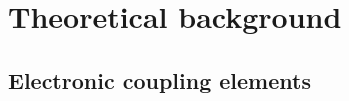 \chapter{Theoretical background}
\label{sec:theory}






\section{Electronic coupling elements}
\label{sec:transfer_integrals}







